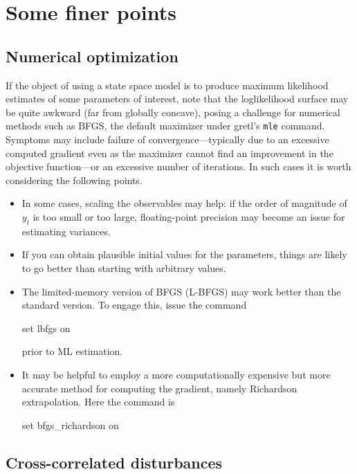 
\section{Some finer points}
\label{sec:finer}

\subsection{Numerical optimization}
\label{sec:ssopt}

If the object of using a state space model is to produce maximum
likelihood estimates of some parameters of interest, note that the
loglikelihood surface may be quite awkward (far from globally
concave), posing a challenge for numerical methods such as BFGS, the
default maximizer under gretl's \texttt{mle} command. Symptoms may
include failure of convergence---typically due to an excessive
computed gradient even as the maximizer cannot find an improvement in
the objective function---or an excessive number of iterations. In such
cases it is worth considering the following points.
\begin{itemize}
\item In some cases, scaling the observables may help: if the order of
  magnitude of $y_t$ is too small or too large, floating-point
  precision may become an issue for estimating variances.
\item If you can obtain plausible initial values for the parameters,
  things are likely to go better than starting with arbitrary values.
\item The limited-memory version of BFGS (L-BFGS) may work better than
  the standard version. To engage this, issue the command
\begin{code}
set lbfgs on
\end{code}
  prior to ML estimation.
\item It may be helpful to employ a more computationally expensive
  but more accurate method for computing the gradient, namely
  Richardson extrapolation. Here the command is
\begin{code}
set bfgs_richardson on
\end{code}
\end{itemize}

\subsection{Cross-correlated disturbances}
\label{sec:crossd}

